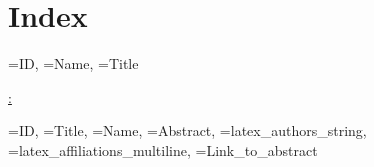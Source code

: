\documentclass[a4paper,12pt]{article}
\begin{document}


\section*{Index}

\begin{itemize}
  {\ID=ID,
  \IndexName=Name,
  \IndexTitle=Title}
  {\item \textbf{\ID} \hyperref[abs:\ID]{\IndexName: \IndexTitle}}
\end{itemize}

\newpage

  {\ID=ID,
  \Title=Title, 
  \Name=Name, 
  \Abstract=Abstract, 
  \Authors=latex_authors_string, 
  \Affiliations=latex_affiliations_multiline,
  \URL=Link_to_abstract}
  {
    \label{abs:\ID}

    \begin{center}
      {\Large \Title \par \vspace{1em}}
    \end{center}

    {\noindent \large \Authors \par \vspace{1em}}

    {\noindent \small \Affiliations \par \vspace{1em}}

    {\noindent \Abstract \par \vspace{1em}}

    {\centering \href{\URL}{\URL} \par}

    \newpage
  }
\end{document}
